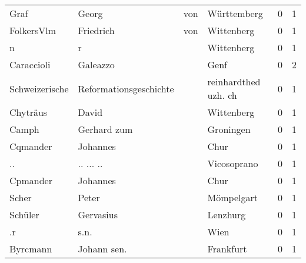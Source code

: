 \begin{tabular}{llllrr}
                     Graf &                              Georg &         von &                                 Württemberg &          0 &         1 \\
               FolkersVlm &                          Friedrich &         von &                                  Wittenberg &          0 &         1 \\
                        n &                                  r &             &                                  Wittenberg &          0 &         1 \\
               Caraccioli &                           Galeazzo &             &                                        Genf &          0 &         2 \\
           Schweizerische &             Reformationsgeschichte &             &                        reinhardthed uzh. ch &          0 &         1 \\
                 Chyträus &                              David &             &                                  Wittenberg &          0 &         1 \\
                    Camph &                        Gerhard zum &             &                                   Groningen &          0 &         1 \\
                 Cqmander &                           Johannes &             &                                        Chur &          0 &         1 \\
                       .. &                          .. ... .. &             &                                 Vicosoprano &          0 &         1 \\
                 Cpmander &                           Johannes &             &                                        Chur &          0 &         1 \\
                    Scher &                              Peter &             &                                  Mömpelgart &          0 &         1 \\
                  Schüler &                          Gervasius &             &                                    Lenzhurg &          0 &         1 \\
                       .r &                               s.n. &             &                                        Wien &          0 &         1 \\
                 Byrcmann &                        Johann sen. &             &                                   Frankfurt &          0 &         1 \\

\end{tabular}
